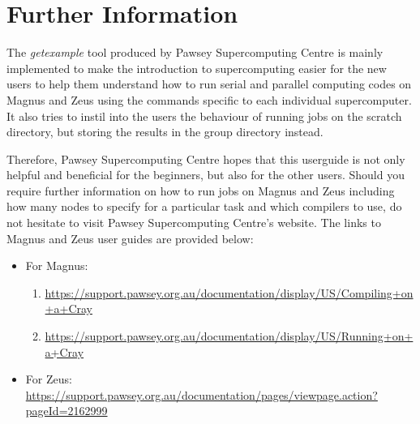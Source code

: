 \section{Further Information}

The \emph{getexample} tool produced by Pawsey Supercomputing Centre is mainly implemented to make the introduction to supercomputing easier for the new 
users to help them understand how to run serial and parallel computing codes on Magnus and Zeus using the commands specific to each individual
supercomputer. It also tries to instil into the users the behaviour of running jobs on the scratch directory, but storing the results in the group directory
instead.

Therefore, Pawsey Supercomputing Centre hopes that this userguide is not only helpful and beneficial for the beginners, but also for the other users. 
Should you require further information on how to run jobs on Magnus and Zeus including how many nodes to specify for a particular task and which
compilers to use, do not hesitate to visit Pawsey Supercomputing Centre's website. The links to Magnus and Zeus user guides are provided below:

\begin{itemize}
\item For Magnus:
\begin{enumerate}
\item \url{https://support.pawsey.org.au/documentation/display/US/Compiling+on+a+Cray}
\item \url{https://support.pawsey.org.au/documentation/display/US/Running+on+a+Cray}
\end{enumerate}
\item For Zeus:\\
\url{https://support.pawsey.org.au/documentation/pages/viewpage.action?pageId=2162999}
\end{itemize}

